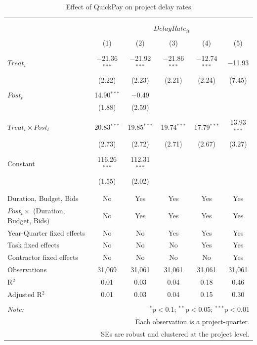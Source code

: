 \documentclass[
]{article}
\begin{document}
\begin{table}[H] \centering 
  \caption{Effect of QuickPay on project delay rates} 
  \label{} 
\small 
\begin{tabular}{@{\extracolsep{-2pt}}lccccc} 
\\[-1.8ex]\hline 
\hline \\[-1.8ex] 
\\[-1.8ex] & \multicolumn{5}{c}{$DelayRate_{it}$} \\ 
\\[-1.8ex] & (1) & (2) & (3) & (4) & (5)\\ 
\hline \\[-1.8ex] 
 $Treat_i$ & $-$21.36$^{***}$ & $-$21.92$^{***}$ & $-$21.86$^{***}$ & $-$12.74$^{***}$ & $-$11.93 \\ 
  & (2.22) & (2.23) & (2.21) & (2.24) & (7.45) \\ 
  & & & & & \\ 
 $Post_t$ & 14.90$^{***}$ & $-$0.49 &  &  &  \\ 
  & (1.88) & (2.59) &  &  &  \\ 
  & & & & & \\ 
 $Treat_i \times Post_t$ & 20.83$^{***}$ & 19.85$^{***}$ & 19.74$^{***}$ & 17.79$^{***}$ & 13.93$^{***}$ \\ 
  & (2.73) & (2.72) & (2.71) & (2.67) & (3.27) \\ 
  & & & & & \\ 
 Constant & 116.26$^{***}$ & 112.31$^{***}$ &  &  &  \\ 
  & (1.55) & (2.02) &  &  &  \\ 
  & & & & & \\ 
\hline \\[-1.8ex] 
Duration, Budget, Bids & No & Yes & Yes & Yes & Yes \\ 
$Post_t \times$  (Duration, Budget, Bids) & No & Yes & Yes & Yes & Yes \\ 
Year-Quarter fixed effects & No & No & Yes & Yes & Yes \\ 
Task fixed effects & No & No & No & Yes & Yes \\ 
Contractor fixed effects & No & No & No & No & Yes \\ 
Observations & 31,069 & 31,061 & 31,061 & 31,061 & 31,061 \\ 
R$^{2}$ & 0.01 & 0.03 & 0.04 & 0.18 & 0.46 \\ 
Adjusted R$^{2}$ & 0.01 & 0.03 & 0.04 & 0.15 & 0.30 \\ 
\hline 
\hline \\[-1.8ex] 
\textit{Note:}  & \multicolumn{5}{r}{$^{*}$p$<$0.1; $^{**}$p$<$0.05; $^{***}$p$<$0.01} \\ 
 & \multicolumn{5}{r}{Each observation is a project-quarter.} \\ 
 & \multicolumn{5}{r}{SEs are robust and clustered at the project level.} \\ 
\end{tabular} 
\end{table}
\end{document}
